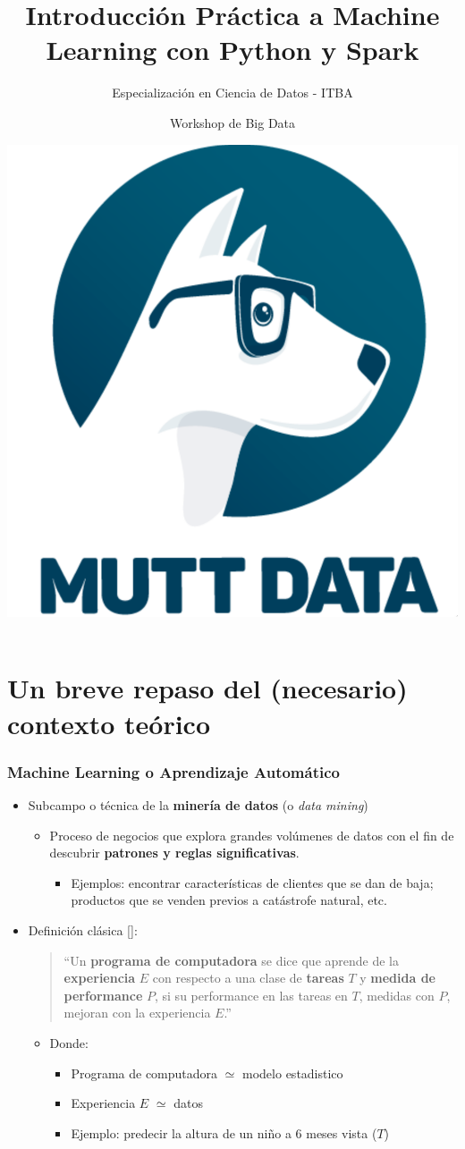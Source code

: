 \documentclass[leqno, 10pt, envcountsect]{beamer}
\title[Intro ML Python]{Introducción Práctica a Machine Learning con Python y
Spark}
\subtitle{Especialización en Ciencia de Datos - ITBA}
\author[]{Workshop de Big Data}
\institute[]{12 de Diciembre de 2019}
\date[]{\includegraphics[scale=0.07]{logo_mutt.png}}
\numberwithin{equation}{section}
\theoremstyle{definition}
\theoremstyle{example}
\numberwithin{figure}{section}
\numberwithin{table}{section}
\let\olditem\item
\renewcommand{\item}{%
\olditem\vspace{1pt}}
\begin{document}
\frame[plain]{\titlepage}

\section{Un breve repaso del (necesario) contexto teórico}
\label{sec:un_poco_de_contexto_teorico}

\begin{frame}
  \frametitle{Machine Learning o Aprendizaje Automático}
  \begin{itemize}
    \item Subcampo o técnica de la \textbf{minería de datos} (o \textit{data mining})
      \begin{itemize}
        \item Proceso de negocios que explora grandes volúmenes de datos con el
          fin de descubrir \textbf{patrones y reglas significativas}.
        \begin{itemize}
          \item Ejemplos: encontrar características de clientes que se dan de
            baja; productos que se venden previos a catástrofe natural, etc.
        \end{itemize}
      \end{itemize}

    \item Definición clásica [\textcite{mitchell97}]:\\
    \begin{quote}
      \enquote{Un \textbf{programa de computadora} se dice que aprende de la
      \textbf{experiencia} $E$ con respecto a una clase de \textbf{tareas} $T$ y
      \textbf{medida de performance} $P$, si su performance en las tareas en
      $T$, medidas con $P$, mejoran con la experiencia $E$.}
    \end{quote}
    \begin{itemize}
      \item Donde:
        \begin{itemize}
      \item Programa de computadora $\simeq$ modelo estadistico
      \item Experiencia $E$ $\simeq$ datos
      \item Ejemplo: predecir la altura de un niño a 6 meses vista ($T$)
      \end{itemize}
    \end{itemize}
  \end{itemize}
\end{frame}
\end{document}
